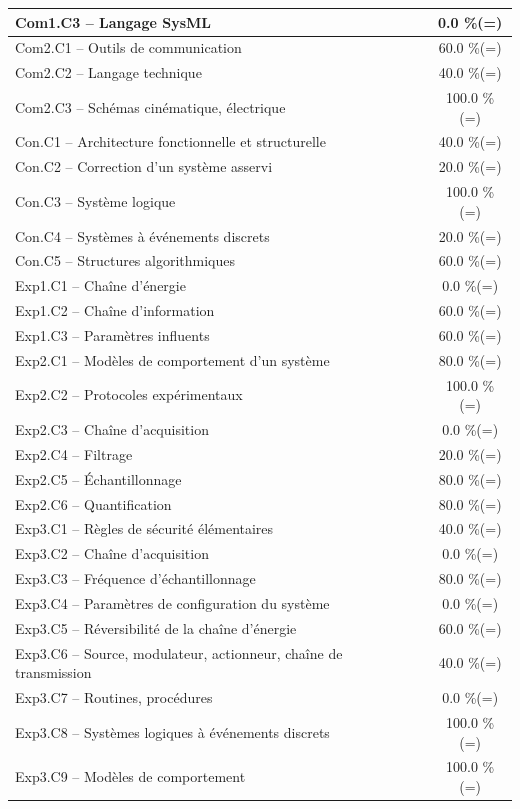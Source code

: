 \begin{center}
\begin{tabular}{|p{.7\linewidth}|c|}
Com1.C3 -- Langage SysML&0.0 \%(=)\\ \hline 
Com2.C1 -- Outils de communication&60.0 \%(=)\\ \hline 
Com2.C2 -- Langage technique&40.0 \%(=)\\ \hline 
Com2.C3 -- Schémas cinématique, électrique&100.0 \%(=)\\ \hline 
Con.C1 -- Architecture fonctionnelle et structurelle&40.0 \%(=)\\ \hline 
Con.C2 -- Correction d’un système asservi&20.0 \%(=)\\ \hline 
Con.C3 -- Système logique&100.0 \%(=)\\ \hline 
Con.C4 -- Systèmes à événements discrets&20.0 \%(=)\\ \hline 
Con.C5 -- Structures algorithmiques&60.0 \%(=)\\ \hline 
Exp1.C1 -- Chaîne d’énergie&0.0 \%(=)\\ \hline 
Exp1.C2 -- Chaîne d’information&60.0 \%(=)\\ \hline 
Exp1.C3 -- Paramètres influents&60.0 \%(=)\\ \hline 
Exp2.C1 -- Modèles de comportement d’un système&80.0 \%(=)\\ \hline 
Exp2.C2 -- Protocoles expérimentaux&100.0 \%(=)\\ \hline 
Exp2.C3 -- Chaîne d’acquisition&0.0 \%(=)\\ \hline 
Exp2.C4 -- Filtrage&20.0 \%(=)\\ \hline 
Exp2.C5 -- Échantillonnage&80.0 \%(=)\\ \hline 
Exp2.C6 -- Quantification&80.0 \%(=)\\ \hline 
Exp3.C1 -- Règles de sécurité élémentaires&40.0 \%(=)\\ \hline 
Exp3.C2 -- Chaîne d'acquisition&0.0 \%(=)\\ \hline 
Exp3.C3 -- Fréquence d’échantillonnage&80.0 \%(=)\\ \hline 
Exp3.C4 -- Paramètres de configuration du système&0.0 \%(=)\\ \hline 
Exp3.C5 -- Réversibilité de la chaîne d’énergie&60.0 \%(=)\\ \hline 
Exp3.C6 -- Source, modulateur, actionneur, chaîne de transmission&40.0 \%(=)\\ \hline 
Exp3.C7 -- Routines, procédures &0.0 \%(=)\\ \hline 
Exp3.C8 -- Systèmes logiques à événements discrets&100.0 \%(=)\\ \hline 
Exp3.C9 -- Modèles de comportement&100.0 \%(=)\\ \hline 

\end{tabular}
\end{center}
